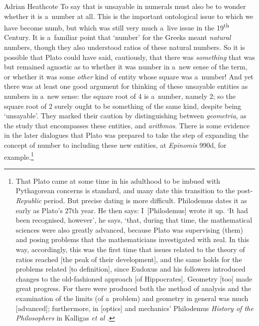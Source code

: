 \begin{artengenv}{Adrian Heathcote}
To say that \sqrtwo is unsayable in numerals must also be to wonder whether it is a~number at all. This is the important ontological issue to which we have become numb, but which was still very much a~live issue in the 19\textsuperscript{th} Century. It is a~familiar point that `number' for the Greeks meant \textit{natural} numbers, though they also understood ratios of these natural numbers. So it is possible that Plato could have said, cautiously, that there was \textit{something} that was \sqrtwo but remained agnostic as to whether it was number in a~new sense of the term, or whether it was some \textit{other} kind of entity whose square was a~number! And yet there was at least one good argument for thinking of these unsayable entities as numbers in a~new sense: the square root of 4 is a~number, namely 2; so the square root of 2 surely ought to be something of the same kind, despite being `unsayable'. They marked their caution by distinguishing between \textit{geometria}, as the study that encompasses these entities, and \textit{arithmos}. There is some evidence in the later dialogues that Plato was prepared to take the step of expanding the concept of number to including these new entities, at  \textit{Epinomis} 990d, for example.\footnote{That Plato came at some time in his adulthood to be imbued with Pythagorean concerns is standard, and many date this transition to the post-\textit{Republic} period. But precise dating is more difficult. Philodemus dates it as early as Plato's 27th year. He then says: I~[Philodemus] wrote it up. ‘It had been recognised, however’, he says, ‘that, during that time, the mathematical sciences were also greatly advanced, because Plato was supervising (them) and posing problems that the mathematicians investigated with zeal. In this way, accordingly, this was the first time that issues related to the theory of ratios reached [the peak of their development], and the same holds for the problems related [to definition], since Eudoxus and his followers introduced changes to the old-fashioned approach [of Hippocrates]. Geometry [too] made great progress. For there were produced both the method of analysis and the examination of the limits (of a~problem) and geometry in general was much [advanced]; furthermore, in [optics] and mechanics\xelip' Philodemus \textit{History of the Philosophers} in Kalligas \emph{et al} \parencite*{kalligas_platos_2020}.}


\end{artengenv}
